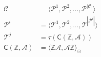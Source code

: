 \documentclass[preview]{standalone}
\begin{document}
\begin{align*}
\mathcal{C} &= \langle \mathcal{P}^{1}, \mathcal{P}^{2}, \dotsc, \mathcal{P}^{|\mathcal{C}|} \rangle \\ \mathcal{P}^{i} &= \langle \mathcal{T}^{1}, \mathcal{T}^{2}, \dotsc, \mathcal{T}^{|\mathcal{P}^{i}|} \rangle \\ \mathcal{T}^{j} &= \tau\left(\mathsf{C}(\mathbb{Z}, \mathcal{A})\right)\\ \mathsf{C}(\mathbb{Z}, \mathcal{A}) &= \langle \mathbb{Z}\mathcal{A}, \mathcal{A}\mathbb{Z} \rangle_{\odot}
\end{align*}
\end{document}
